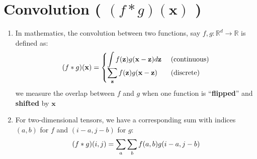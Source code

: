 \section{Convolution ( $(f * g)(\mathbf{x})$ ) \cite{dnn-1}} \label{function: Convolution}

\begin{enumerate}
    \item In mathematics, the convolution between two functions, say $f, g: \mathbb{R}^d \to \mathbb{R}$ is defined as:
    \[
        \hfill
        (f * g)(\mathbf{x}) = 
        \begin{cases}
            \dint f(\mathbf{z}) g(\mathbf{x}-\mathbf{z}) d\mathbf{z} & \text{ (continuous)} \\[1ex]
            \dsum_\mathbf{z} f(\mathbf{z}) g(\mathbf{x}-\mathbf{z}) & \text{ (discrete)} \\
        \end{cases}
        \hfill
    \]
    we measure the overlap between $f$ and $g$ when one function is “\textbf{flipped}” and \textbf{shifted} by $\mathbf{x}$

    \item For two-dimensional tensors, we have a corresponding sum with indices $(a, b)$ for $f$ and $(i - a, j - b)$ for $g$:
    \[
        \hfill
        (f * g)(i, j) = \dsum_a\dsum_b f(a, b) g(i-a, j-b)
        \hfill
    \]
\end{enumerate}













































